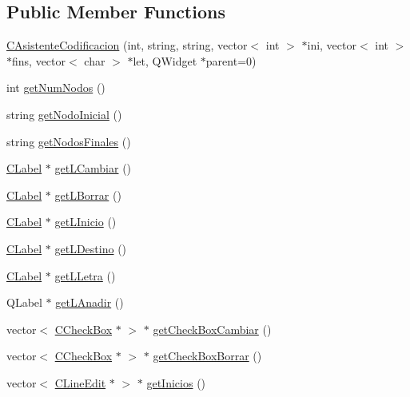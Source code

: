 \subsection*{Public Member Functions}
\begin{DoxyCompactItemize}
\item 
\hyperlink{classCAsistenteCodificacion_a0c2afc1f5979b36212e847524419e8f9}{C\+Asistente\+Codificacion} (int, string, string, vector$<$ int $>$ $\ast$ini, vector$<$ int $>$ $\ast$fins, vector$<$ char $>$ $\ast$let, Q\+Widget $\ast$parent=0)
\item 
int \hyperlink{classCAsistenteCodificacion_ac65429657b7d034bb8b422ed61b5841c}{get\+Num\+Nodos} ()
\item 
string \hyperlink{classCAsistenteCodificacion_a249f33a94fb1ec310f61ed79e756a630}{get\+Nodo\+Inicial} ()
\item 
string \hyperlink{classCAsistenteCodificacion_a73fc973e9134649fa288b499a0723192}{get\+Nodos\+Finales} ()
\item 
\hyperlink{classCLabel}{C\+Label} $\ast$ \hyperlink{classCAsistenteCodificacion_a3b17ecf32b2b4b5e8d3900cdeaa780ff}{get\+L\+Cambiar} ()
\item 
\hyperlink{classCLabel}{C\+Label} $\ast$ \hyperlink{classCAsistenteCodificacion_acee142b78f7055424fb48d6df9dcee98}{get\+L\+Borrar} ()
\item 
\hyperlink{classCLabel}{C\+Label} $\ast$ \hyperlink{classCAsistenteCodificacion_a63fcc7bde25a4dc813d81f6591997989}{get\+L\+Inicio} ()
\item 
\hyperlink{classCLabel}{C\+Label} $\ast$ \hyperlink{classCAsistenteCodificacion_abb26c06c814cf91080a1b9d83400a77d}{get\+L\+Destino} ()
\item 
\hyperlink{classCLabel}{C\+Label} $\ast$ \hyperlink{classCAsistenteCodificacion_adf8377459fe4ec5cf0a963fd9282420e}{get\+L\+Letra} ()
\item 
Q\+Label $\ast$ \hyperlink{classCAsistenteCodificacion_a7cdb8dcc5d3027177721fc628e3c53ae}{get\+L\+Anadir} ()
\item 
vector$<$ \hyperlink{classCCheckBox}{C\+Check\+Box} $\ast$ $>$ $\ast$ \hyperlink{classCAsistenteCodificacion_af5c7ebbcf38b72cb912ccec2c4309323}{get\+Check\+Box\+Cambiar} ()
\item 
vector$<$ \hyperlink{classCCheckBox}{C\+Check\+Box} $\ast$ $>$ $\ast$ \hyperlink{classCAsistenteCodificacion_aba95e5e21d3f5cccad79139fc7ffbe7e}{get\+Check\+Box\+Borrar} ()
\item 
vector$<$ \hyperlink{classCLineEdit}{C\+Line\+Edit} $\ast$ $>$ $\ast$ \hyperlink{classCAsistenteCodificacion_a6e18515302506ef6766a5a4bdbb64dfd}{get\+Inicios} ()

\end{DoxyCompactItemize}
